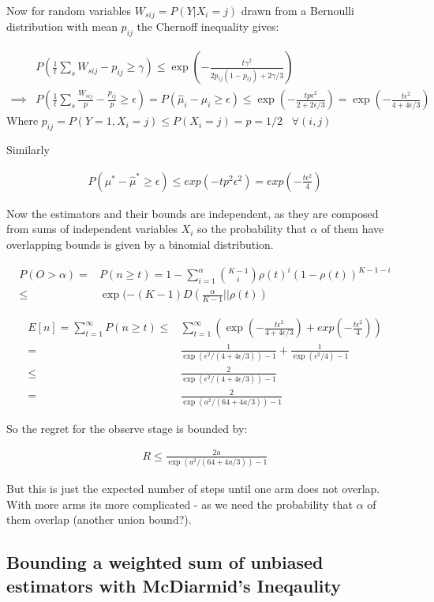 \documentclass{article}
\newcommand{\eqn}[1]{\begin{align}#1\end{align}}
\theoremstyle{plain}
\theoremstyle{definition}
\begin{document}
Now for random variables $W_{sij} = P(Y|X_i=j)$ drawn from a Bernoulli distribution with mean $p_{ij}$ the Chernoff inequality gives:

\eqn {
& P(\frac{1}{t}\sum_s W_{sij} - p_{ij} \geq \gamma) \leq \exp(-\frac{t\gamma^2}{2p_{ij}(1-p_{ij})+2\gamma/3}) \\
\implies & P(\frac{1}{t}\sum_s \frac{W_{sij}}{p} - \frac{p_{ij}}{p} \geq \epsilon) = P(\hat{\mu}_i - \mu_i \geq \epsilon) \leq \exp(-\frac{tp\epsilon^2}{2+2\epsilon/3}) = \exp(-\frac{t\epsilon^2}{4+4\epsilon/3})
}
Where $p_{ij} = P(Y = 1, X_i = j) \leq P(X_i=j) = p = 1/2 \;\;\; \forall(i,j)$

Similarly 

\eqn {
P(\mu^* - \hat{\mu}^* \geq \epsilon) \leq exp(-tp^2\epsilon^2) = exp(-\frac{t\epsilon^2}{4})
}

Now the estimators and their bounds are independent, as they are composed from sums of independent variables $X_i$ so the probability that $\alpha$ of them have overlapping bounds is given by a binomial distribution. 

\eqn {
P(O > \alpha)  = & P(n \geq t) = 1 - \sum_{i=1}^\alpha \binom{K-1}{i}\rho(t)^{i}(1-\rho(t))^{K-1-i} \\
\leq & \exp(-(K-1)D(\frac{\alpha}{K-1} || \rho(t))
} 

\eqn {
E[n] = \sum_{t=1}^\infty P(n \geq t) \leq & \sum_{t=1}^\infty \left( \exp(-\frac{t\epsilon^2}{4+4\epsilon/3}) +exp(-\frac{t\epsilon^2}{4}) \right) \\
= & \frac{1}{\exp(\epsilon^2/(4+4\epsilon/3)) - 1} + \frac{1}{\exp(\epsilon^2/4) - 1} \\
\leq & \frac{2}{\exp(\epsilon^2/(4+4\epsilon/3)) - 1} \\
= & \frac{2}{\exp(a^2/(64+4a/3)) - 1}
}

So the regret for the observe stage is bounded by:

\eqn {
R \leq \frac{2a}{\exp(a^2/(64+4a/3)) - 1}
}





But this is just the expected number of steps until one arm does not overlap. With more arms its more complicated - as we need the probability that $\alpha$ of them overlap (another union bound?).






\subsection{Bounding a weighted sum of unbiased estimators with McDiarmid's Ineqaulity}
\end{document}
